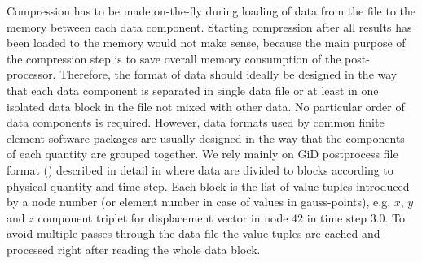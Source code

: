 Compression has to be made on-the-fly during loading of data from the file to the memory between each data component. Starting compression after all results has been loaded to the memory would not make sense, because the main purpose of the compression step is to save overall memory consumption of the post-processor. Therefore, the format of data should ideally be designed in the way that each data component is separated in single data file or at least in one isolated data block in the file not mixed with other data. No particular order of data components is required. However, data formats used by common finite element software packages are usually designed in the way that the components of each quantity are grouped together. We rely mainly on GiD postprocess file format () described in detail in \cite{XXX-12} where data are divided to blocks according to physical quantity and time step. Each block is the list of value tuples introduced by a node number (or element number in case of values in gauss-points), e.g. $x$, $y$ and $z$ component triplet for displacement vector in node $42$ in time step $3.0$. To avoid multiple passes through the data file the value tuples are cached and processed right after reading the whole data block.

